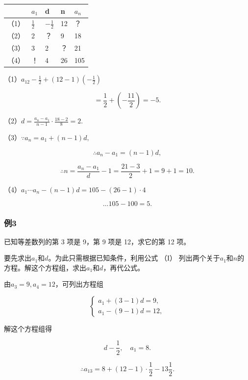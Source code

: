 {\def\LTcaptype{none} %
\begin{longtable}[]{@{}lllll@{}}
\toprule\noalign{}
& \(a_1\) & d & n & \(a_n\) \\
\midrule\noalign{}
\endhead
\bottomrule\noalign{}
\endlastfoot
（1） & \(\frac{1}{2}\) & \(-\frac{1}{2}\) & 12 & ？ \\
（2） & 2 & ？ & 9 & 18 \\
（3） & 3 & 2 & ？ & 21 \\
（4） & ！ & 4 & 26 & 105 \\
\end{longtable}
}

（1）\(a_{12} - \frac{1}{2} + (12 - 1)\left(-\frac{1}{2}\right)\)

\[
= \frac{1}{2} + \left(- \frac{11}{2}\right) = - 5.
\]

（2）\(d = \frac{a_n - a_1}{n - 1} \cdot \frac{18 - 2}{8} = 2.\)

（3）\(\because a_{n} = a_{1} + (n - 1)d,\)

\[
\therefore a_{n} - a_{1} = (n - 1) d,
\]

\[
\therefore n = \frac{a_{n} - a_{1}}{d} - 1 = \frac{21 - 3}{2} + 1 = 9 + 1 = 10.
\]

（4）\(a_{1} \cdots a_{n} - (n - 1)d = 105 - (26 - 1) \cdot 4\)

\[
\dots 105 - 100 = 5.
\]

\subsubsection{例3}

已知等差数列的第 3 项是 9，第 9 项是 12，求它的第 12 项。

 要先求出\(a_1\)和\(d\)。为此只需根据已知条件，利用公式
（I）
列出两个关于\(a_1\)和\(n\)的方程。解这个方程组，求出\(a_1\)和\(d\)，再代公式。

 由\(a_{3} = 9, a_{4} = 12\)，可列出方程组

\[
\left\{ \begin{array}{l} a_{1} + (3 - 1) d = 9, \\ a_{1} - (9 - 1) d = 12, \end{array} \right.
\]

解这个方程组得

\[
d - \frac{1}{2}, \quad a_{1} = 8.
\]

\[
\therefore a_{13} = 8 + (12 - 1) \cdot \frac{1}{2} - 13 \frac{1}{2}.
\]

